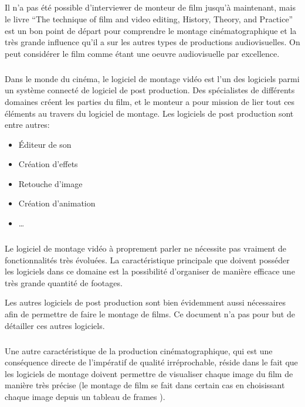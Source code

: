 \subparagraph{}

Il n'a pas été possible d'interviewer de monteur de film jusqu'à
maintenant, mais le livre ``The technique of film and video editing,
History, Theory, and Practice'' \cite{TheTechniqueOfFilmAndVideoEditing}
est un bon point de départ pour comprendre le montage cinématographique
et la très grande influence qu'il a sur les autres types de productions
audiovisuelles. On peut considérer le film comme étant une oeuvre
audiovisuelle par excellence.

\subparagraph{}

Dans le monde du cinéma, le logiciel de montage vidéo est l'un des
logiciels parmi un système connecté de logiciel de post production. Des
spécialistes de différents domaines créent les parties du film,
et le monteur a pour mission de lier tout ces éléments au travers du
logiciel de montage. Les logiciels de post production sont entre autres:

\begin{itemize} \setlength{\itemsep}{2mm}

  \item{Éditeur de son}

  \item{Création d'effets}

  \item{Retouche d'image}

  \item{Création d'animation}

  \item{\ldots}

\end{itemize}

\subparagraph{}

Le logiciel de montage vidéo à proprement parler ne nécessite pas
vraiment de fonctionnalités très évoluées. La caractéristique
principale que doivent posséder les logiciels dans ce domaine est la
possibilité d'organiser de manière efficace une très grande quantité
de footages.

Les autres logiciels de post production sont bien évidemment aussi
nécessaires afin de permettre de faire le montage de films. Ce document
n'a pas pour but de détailler ces autres logiciels.

\subparagraph{}

Une autre caractéristique de la production cinématographique, qui est
une conséquence directe de l'impératif de qualité irréprochable,
réside dans le fait que les logiciels de montage doivent permettre de
visualiser chaque image du film de manière très précise (le montage
de film se fait dans certain cas en choisissant chaque image depuis un
tableau de frames ).


